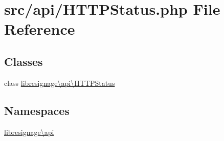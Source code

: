 \hypertarget{HTTPStatus_8php}{}\section{src/api/\+H\+T\+T\+P\+Status.php File Reference}
\label{HTTPStatus_8php}
\subsection*{Classes}
\begin{DoxyCompactItemize}
\item 
class \hyperlink{classlibresignage_1_1api_1_1HTTPStatus}{libresignage\textbackslash{}api\textbackslash{}\+H\+T\+T\+P\+Status}
\end{DoxyCompactItemize}
\subsection*{Namespaces}
\begin{DoxyCompactItemize}
\item 
 \hyperlink{namespacelibresignage_1_1api}{libresignage\textbackslash{}api}
\end{DoxyCompactItemize}
